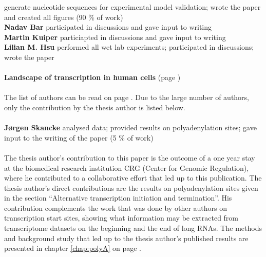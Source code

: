 generate nucleotide sequences for experimental model validation; wrote the
paper and created all figures (90 \% of work) \\
\textbf{Nadav Bar} participated in discussions and gave input to writing\\
\textbf{Martin Kuiper} particiapted in discussions and gave input to writing\\
\textbf{Lilian M. Hsu} performed all wet lab experiments;
participated in discussions; wrote the paper\\
\\
\textbf{Landscape of transcription in human cells} (page \pageref{landscape})\\
\\
The list of authors can be read on page \pageref{landscape}. Due to the large
number of authors, only the contribution by the thesis author is listed below.
\\
\\
\textbf{J\o rgen Skancke} analysed data; provided results on polyadenylation
sites; gave input to the writing of the paper (5 \% of work)\\
\\
The thesis author's contribution to this paper is the outcome of a one year
stay at the biomedical research institution CRG (Center for Genomic
Regulation), where he contributed to a collaborative effort that led up to this
publication. The thesis author's direct contributions are the results on
polyadenylation sites given in the section ``Alternative transcription
initiation and termination''. His contribution complements the work that was
done by other authors on transcription start sites, showing what information
may be extracted from transcriptome datasets on the beginning and the end of
long RNAs. The methods and background study that led up to the thesis author's
published results are presented in chapter \ref{chap:polyA} on page
\pageref{chap:polyA}.
